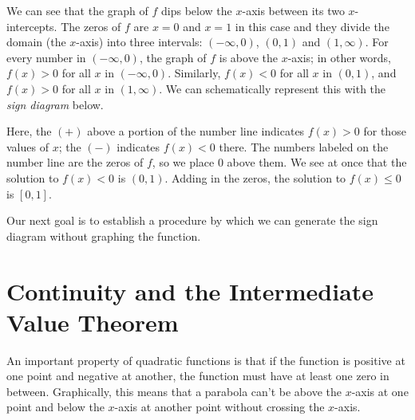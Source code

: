 \documentclass[noauthor, nooutcomes]{ximera}
\begin{document}
We can see that the graph of $f$ dips below the $x$-axis between its two $x$-intercepts.  The zeros of $f$ are $x=0$ and $x=1$ in this case and they divide the domain (the $x$-axis) into three intervals:  $(-\infty, 0)$, $(0, 1)$ and $(1, \infty)$.  For every number in $(-\infty, 0)$, the graph of $f$ is above the $x$-axis; in other words, $f(x) > 0$ for all $x$ in $(-\infty, 0)$. Similarly, $f(x) < 0$ for all $x$ in $(0,1)$, and $f(x) > 0$ for all $x$ in $(1, \infty)$.  We can schematically represent this with the \emph{sign diagram} below.
\begin{image}
\end{image}

Here, the $(+)$ above a portion of the number line indicates $f(x) > 0$ for those values of $x$; the $(-)$ indicates $f(x) < 0$ there.  The numbers labeled on the number line are the zeros of $f$, so we place $0$ above them.  We see at once that the solution to $f(x) < 0$ is $(0, 1)$. Adding in the zeros, the solution to $f(x) \le 0$ is $[0, 1]$. 

Our next goal is to establish a procedure by which we can generate the sign diagram without graphing the function.

\section{Continuity and the Intermediate Value Theorem}
An important property of quadratic functions is that if the function is positive at one point and negative at another, the function must have at least one zero in between. Graphically, this means that a parabola can't be above the $x$-axis at one point and below the $x$-axis at another point without crossing the $x$-axis. 
\end{document}
